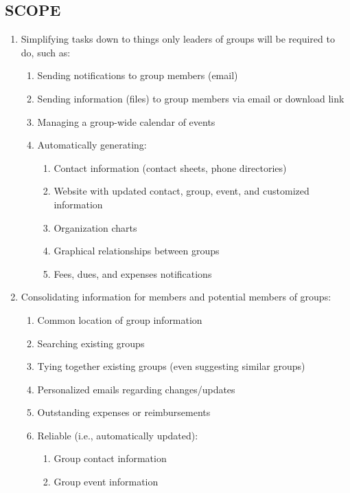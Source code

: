 \documentclass[12pt]{report}
\begin{document}
 \subsection{SCOPE}
  \begin{enumerate}
    \item Simplifying tasks down to things only leaders of groups will be required to do, such as:
    \begin{enumerate}
     \item Sending notifications to group members (email)
     \item Sending information (files) to group members via email or download link
     \item Managing a group-wide calendar of events
     \item Automatically generating:
      \begin{enumerate}
       \item Contact information (contact sheets, phone directories)
       \item Website with updated contact, group, event, and customized information
       \item Organization charts
       \item Graphical relationships between groups
       \item Fees, dues, and expenses notifications
      \end{enumerate}
    \end{enumerate}
   \item Consolidating information for members and potential members of groups:
    \begin{enumerate}
     \item Common location of group information
     \item Searching existing groups
     \item Tying together existing groups (even suggesting similar groups)
     \item Personalized emails regarding changes/updates
     \item Outstanding expenses or reimbursements
     \item Reliable (i.e., automatically updated):
      \begin{enumerate}
       \item Group contact information
       \item Group event information
      \end{enumerate}
    \end{enumerate}
  \end{enumerate}
\end{document}
